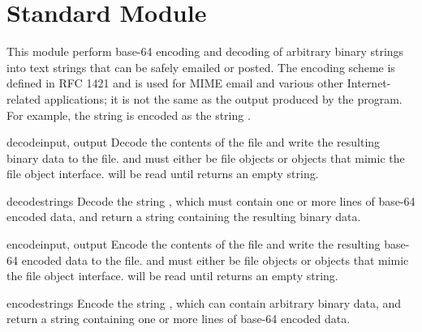 \section{Standard Module }
\label{module-base64}

This module perform base-64 encoding and decoding of arbitrary binary
strings into text strings that can be safely emailed or posted.  The
encoding scheme is defined in RFC 1421 and is used for MIME email and
various other Internet-related applications; it is not the same as the
output produced by the  program.  For example, the
string  is encoded as the string
.  

\renewcommand{\indexsubitem}{(in module base64)}

\begin{funcdesc}{decode}{input, output}
Decode the contents of the  file and write the resulting
binary data to the  file.
 and  must either be file objects or objects that
mimic the file object interface.  will be read until
 returns an empty string.
\end{funcdesc}

\begin{funcdesc}{decodestring}{s}
Decode the string , which must contain one or more lines of
base-64 encoded data, and return a string containing the resulting
binary data.
\end{funcdesc}

\begin{funcdesc}{encode}{input, output}
Encode the contents of the  file and write the resulting
base-64 encoded data to the  file.
 and  must either be file objects or objects that
mimic the file object interface.  will be read until
 returns an empty string.
\end{funcdesc}

\begin{funcdesc}{encodestring}{s}
Encode the string , which can contain arbitrary binary data,
and return a string containing one or more lines of
base-64 encoded data.
\end{funcdesc}



